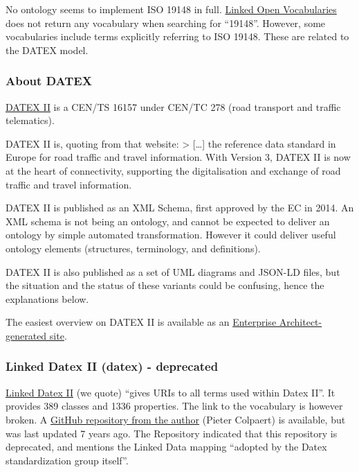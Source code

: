 \documentclass[
  11pt,
]{article}
\begin{document}
No ontology seems to implement ISO 19148 in full.
\href{https://lov.linkeddata.es/dataset/lov}{Linked Open Vocabularies}
does not return any vocabulary when searching for ``19148''. However,
some vocabularies include terms explicitly referring to ISO 19148. These
are related to the DATEX model.

\hypertarget{about-datex}{%
\subsubsection{About DATEX}\label{about-datex}}

\href{https://datex2.eu/}{DATEX II} is a CEN/TS 16157 under CEN/TC 278
(road transport and traffic telematics).

DATEX II is, quoting from that website: \textgreater{} {[}\ldots{]} the
reference data standard in Europe for road traffic and travel
information. With Version 3, DATEX II is now at the heart of
connectivity, supporting the digitalisation and exchange of road traffic
and travel information.

DATEX II is published as an XML Schema, first approved by the EC in
2014. An XML schema is not being an ontology, and cannot be expected to
deliver an ontology by simple automated transformation. However it could
deliver useful ontology elements (structures, terminology, and
definitions).

DATEX II is also published as a set of UML diagrams and JSON-LD files,
but the situation and the status of these variants could be confusing,
hence the explanations below.

The easiest overview on DATEX II is available as an
\href{https://docs.datex2.eu/v3.4/_static/data/v3.4/umlmodel/html/index.htm}{Enterprise
Architect-generated site}.

\hypertarget{linked-datex-ii-datex---deprecated}{%
\subsubsection{Linked Datex II (datex) -
deprecated}\label{linked-datex-ii-datex---deprecated}}

\href{https://lov.linkeddata.es/dataset/lov/vocabs/datex}{Linked Datex
II} (we quote) ``gives URIs to all terms used within Datex II''. It
provides 389 classes and 1336 properties. The link to the vocabulary is
however broken. A
\href{https://github.com/OpenTransport/linked-datex2/blob/master/vocabulary.ttl}{GitHub
repository from the author} (Pieter Colpaert) is available, but was last
updated 7 years ago. The Repository indicated that this repository is
deprecated, and mentions the Linked Data mapping ``adopted by the Datex
standardization group itself''.
\end{document}
